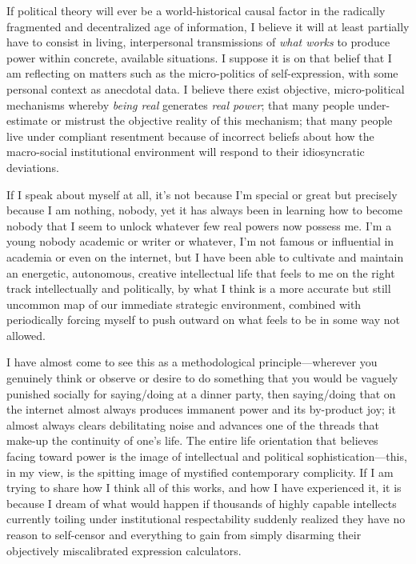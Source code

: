\documentclass[a4paper,12pt,margin=.5in]{article}
\begin{document}
If political theory will ever be a world-historical causal factor in the
radically fragmented and decentralized age of information, I believe it
will at least partially have to consist in living, interpersonal
transmissions of \emph{what works} to produce power within concrete,
available situations. I suppose it is on that belief that I am
reflecting on matters such as the micro-politics of self-expression,
with some personal context as anecdotal data. I believe there exist
objective, micro-political mechanisms whereby \emph{being real}
generates \emph{real power}; that many people under-estimate or mistrust
the objective reality of this mechanism; that many people live under
compliant resentment because of incorrect beliefs about how the
macro-social institutional environment will respond to their
idiosyncratic deviations.

If I speak about myself at all, it's not because I'm special or great
but precisely because I am nothing, nobody, yet it has always been in
learning how to become nobody that I seem to unlock whatever few real
powers now possess me. I'm a young nobody academic or writer or
whatever, I'm not famous or influential in academia or even on the
internet, but I have been able to cultivate and maintain an energetic,
autonomous, creative intellectual life that feels to me on the right
track intellectually and politically, by what I think is a more accurate
but still uncommon map of our immediate strategic environment, combined
with periodically forcing myself to push outward on what feels to be in
some way not allowed.

I have almost come to see this as a methodological principle---wherever
you genuinely think or observe or desire to do something that you would
be vaguely punished socially for saying/doing at a dinner party, then
saying/doing that on the internet almost always produces immanent power
and its by-product joy; it almost always clears debilitating noise and
advances one of the threads that make-up the continuity of one's life.
The entire life orientation that believes facing toward power is the
image of intellectual and political sophistication---this, in my view,
is the spitting image of mystified contemporary complicity. If I am
trying to share how I think all of this works, and how I have
experienced it, it is because I dream of what would happen if thousands
of highly capable intellects currently toiling under institutional
respectability suddenly realized they have no reason to self-censor and
everything to gain from simply disarming their objectively miscalibrated
expression calculators.
\end{document}
